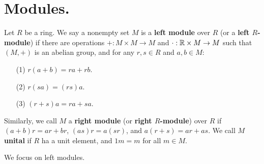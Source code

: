 
\section{Modules.}
\label{section1}

\begin{definition}
    Let $R$ be a ring. We say a nonempty set $M$ is a \textbf{left module} over $R$  (or a
    \textbf{left $R$-module}) if there are operations $+:M \times M \rightarrow M$ and $\cdot:\mathbb{R}
    \times M \rightarrow M$ such that $(M,+)$ is an abelian group, and for any $r,s \in R$ and $a,b
    \in M$:
        \begin{enumerate}
            \item[(1)] $r(a+b)=ra+rb$.

            \item[(2)] $r(sa)=(rs)a$.

            \item[(3)] $(r+s)a=ra+sa$.
        \end{enumerate}
        Similarly, we call $M$ a \textbf{right module} (or \textbf{right $R$-module}) over $R$ if
        $(a+b)r=ar+br$, $(as)r=a(sr)$, and $a(r+s)=ar+as$.
    We call $M$  \textbf{unital} if $R$ ha a unit element, and  $1m=m$ for all  $m \in M$.
\end{definition}

We focus on left modules.

